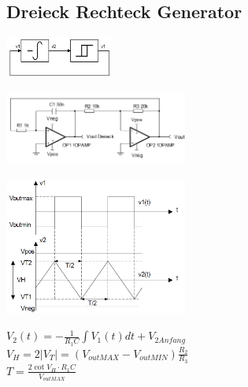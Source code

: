 \subsection{Dreieck Rechteck Generator}
	\begin{multicols}{3}
		\begin{center}
			\includegraphics[width=3.5cm]{images/osziDreieckRechteckBlock.png}\\
		\end{center}
		\includegraphics[width=6cm]{images/osziDreieckRechteck.png}
		\columnbreak
		
		\includegraphics[width=6cm]{images/osziDreieckRechteckSignal.png}
		\columnbreak
			
		$V_2\left(t\right)=-\frac{1}{R_1C}\int V_1\left(t\right)dt+V_{2 Anfang}$\\
		$V_H=2\left|V_T\right|=\left(V_{outMAX}-V_{outMIN}\right)\frac{R_2}{R_3}$\\
		$T=\frac{2\cot V_H \cdot R_1C}{V_{outMAX}}$\\
	\end{multicols}
